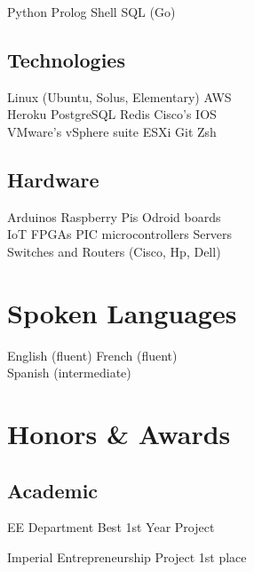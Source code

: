 \documentclass[a4paper]{alex-resume}
\begin{document}
\begin{minipage}[t]{0.38\textwidth}
\location{}
Python \textbullet{} Prolog \textbullet{} Shell \textbullet{} SQL \textbullet{} (Go)
\sectionsep

\subsection{Technologies}
Linux (Ubuntu, Solus, Elementary) \textbullet{} AWS \\
Heroku \textbullet{} PostgreSQL \textbullet{} Redis \textbullet{} Cisco's IOS \\
VMware's vSphere suite \textbullet{} ESXi \textbullet{} Git \textbullet{} Zsh
\sectionsep

\subsection{Hardware}
Arduinos \textbullet{} Raspberry Pis \textbullet{} Odroid boards \\
IoT \textbullet{} FPGAs \textbullet{} PIC microcontrollers \textbullet{} Servers \\
Switches and Routers (Cisco, Hp, Dell)

\chaptersep


\section{Spoken Languages}

English (fluent) \textbullet{} French (fluent) \\
Spanish (intermediate)

\chaptersep


\section{Honors \& Awards}

\subsection{Academic}
\vspace{\topsep}
\begin{tightemize}
\item EE Department Best 1st Year Project
\item Imperial Entrepreneurship Project 1st place
\end{tightemize}
\sectionsep


\end{minipage}
\end{document}
